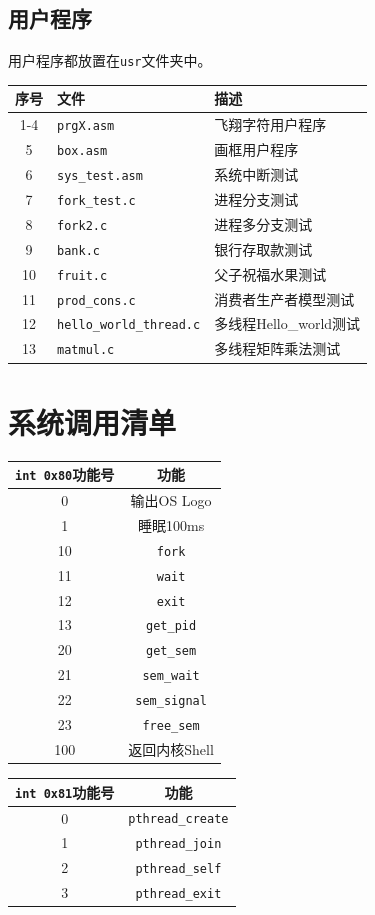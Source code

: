 \documentclass[logo,reportComp]{thesis}
\begin{document}
\subsection{用户程序}
用户程序都放置在\verb'usr'文件夹中。
\begin{center}
\begin{tabular}{|c|l|l|}\hline
\textbf{序号} & \textbf{文件} & \textbf{描述} \\\hline
1-4 & \verb'prgX.asm' & 飞翔字符用户程序\\\hline
5 & \verb'box.asm' & 画框用户程序\\\hline
6 & \verb'sys_test.asm' & 系统中断测试\\\hline
7 & \verb'fork_test.c' & 进程分支测试\\\hline
8 & \verb'fork2.c' & 进程多分支测试\\\hline
9 & \verb'bank.c' & 银行存取款测试\\\hline
10 & \verb'fruit.c' & 父子祝福水果测试\\\hline
11 & \verb'prod_cons.c' & 消费者生产者模型测试\\\hline
12 & \verb'hello_world_thread.c' & 多线程Hello\_world测试\\\hline
13 & \verb'matmul.c' & 多线程矩阵乘法测试\\\hline
\end{tabular}
\end{center}

\section{系统调用清单}
\label{sec:syscall}
\begin{center}
\begin{tabular}{|c|c|}\hline
\verb'int 0x80'\textbf{功能号} & \textbf{功能}\\\hline
0 & 输出OS Logo\\\hline
1 & 睡眠100ms\\\hline
10 & \verb'fork'\\\hline
11 & \verb'wait'\\\hline
12 & \verb'exit'\\\hline
13 & \verb'get_pid'\\\hline
20 & \verb'get_sem'\\\hline
21 & \verb'sem_wait'\\\hline
22 & \verb'sem_signal'\\\hline
23 & \verb'free_sem'\\\hline
100 & 返回内核Shell\\\hline
\end{tabular}
\end{center}

\begin{center}
\begin{tabular}{|c|c|}\hline
\verb'int 0x81'\textbf{功能号} & \textbf{功能}\\\hline
0 & \verb'pthread_create'\\\hline
1 & \verb'pthread_join'\\\hline
2 & \verb'pthread_self'\\\hline
3 & \verb'pthread_exit'\\\hline
\end{tabular}
\end{center}
\end{document}
